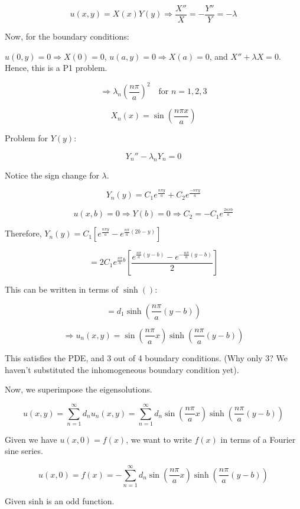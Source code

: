 \documentclass{article}
\begin{document}
$$u(x,y) = X(x) Y(y) \Rightarrow \frac{X''}{X} = - \frac{Y''}{Y} = - \lambda$$

Now, for the boundary conditions:

$u(0,y) = 0 \Rightarrow X(0) = 0$, $u(a,y) = 0 \Rightarrow X(a) = 0$, and $X'' + \lambda X = 0$. Hence, this is a P1 problem. 

$$\Rightarrow \lambda_n  \left( \frac{n \pi}{a} \right)^2 \quad \text{for } n = 1,2,3$$


$$X_n(x) = \sin \left( \frac{n \pi x}{a} \right)$$

Problem for $Y(y)$:

$$Y_n '' - \lambda_n Y_n = 0$$

Notice the sign change for $\lambda$.


$$Y_n(y) = C_1 e^{\frac{n \pi y}{a}} + C_2  e^{\frac{- n \pi y}{a}}$$

$$u(x,b) = 0 \Rightarrow Y(b) = 0 \Rightarrow C_2 = - C_1 e^{\frac{2 n \pi b}{a}}$$

\begin{center}
    Therefore, $Y_n (y) = C_1 \left[ e^{\frac{n \pi y}{a}} - e^{ \frac{n \pi}{a} (2b-y)} \right]$
\end{center}
 
 $$ = 2 C_1 e^{\frac{n \pi}{a} b} \left[ \frac{e^{ \frac{n \pi}{a} (y-b)} - e^{- \frac{n \pi}{a} (y-b)}}{2} \right]$$
 
 This can be written in terms of $\sinh()$:
 
 $$ = d_1 \sinh \left( \frac{n \pi}{a} (y-b) \right)$$
 
$$\Rightarrow u_n (x,y) = \sin \left( \frac{n \pi}{a} x \right) \sinh \left( \frac{n \pi}{a} (y-b) \right)$$

This satisfies the PDE, and 3 out of 4 boundary conditions. (Why only 3? We haven't substituted the inhomogeneous boundary condition yet). 

Now, we superimpose the eigensolutions. 

$$u(x,y) = \sum_{n=1}^\infty d_n u_n (x,y) = \sum_{n=1}^\infty d_n  \sin \left( \frac{n \pi}{a} x \right) \sinh \left( \frac{n \pi}{a} (y-b) \right)$$

Given we have $u(x,0) = f(x)$, we want to write $f(x)$ in terms of a Fourier sine series. 

$$u(x,0) = f(x) = - \sum_{n=1}^\infty d_n \sin \left( \frac{n \pi}{a} x \right) \sinh \left( \frac{n \pi}{a} (y-b) \right)$$

Given sinh is an odd function. 
\end{document}
